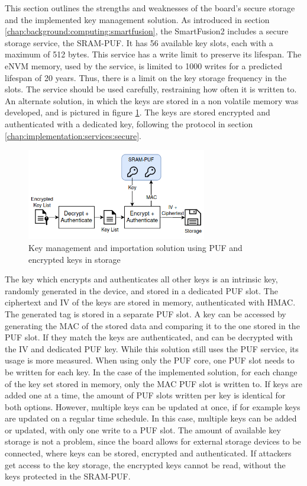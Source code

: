 This section outlines the strengths and weaknesses of the board's secure storage and the implemented key management solution. 
As introduced in section \ref{chap:background:computing:smartfusion}, the SmartFusion2 includes a secure storage service, the SRAM-PUF. It has 56 available key slots, each with a maximum of 512 bytes. This service has a write limit to preserve its lifespan. The eNVM memory, used by the service, is limited to 1000 writes for a predicted lifespan of 20 years. Thus, there is a limit on the key storage frequency in the slots. The service should be used carefully, restraining how often it is written to.
An alternate solution, in which the keys are stored in a non volatile memory was developed, and is pictured in figure \ref{fig:implementation:key-management}. The keys are stored encrypted and authenticated with a dedicated key, following the protocol in section \ref{chap:implementation:services:secure}.
\begin{figure}[h!]
	\centering
	\includegraphics[width=0.7\textwidth]{./Images/key-management.png}
	\caption{Key management and importation solution using PUF and encrypted keys in storage}
	\label{fig:implementation:key-management}
\end{figure}
The key which encrypts and authenticates all other keys is an intrinsic key, randomly generated in the device, and stored in a dedicated PUF slot. The ciphertext and IV of the keys are stored in memory, authenticated with HMAC. The generated tag is stored in a separate PUF slot.
A key can be accessed by generating the MAC of the stored data and comparing it to the one stored in the PUF slot. If they match the keys are authenticated, and can be decrypted with the IV and dedicated PUF key.
While this solution still uses the PUF service, its usage is more measured. When using only the PUF core, one PUF slot needs to be written for each key. In the case of the implemented solution, for each change of the key set stored in memory, only the MAC PUF slot is written to. If keys are added one at a time, the amount of PUF slots written per key is identical for both options. However, multiple keys can be updated at once, if for example keys are updated on a regular time schedule. In this case, multiple keys can be added or updated, with only one write to a PUF slot. The amount of available key storage is not a problem, since the board allows for external storage devices to be connected, where keys can be stored, encrypted and authenticated. If attackers get access to the key storage, the encrypted keys cannot be read, without the keys protected in the SRAM-PUF.
